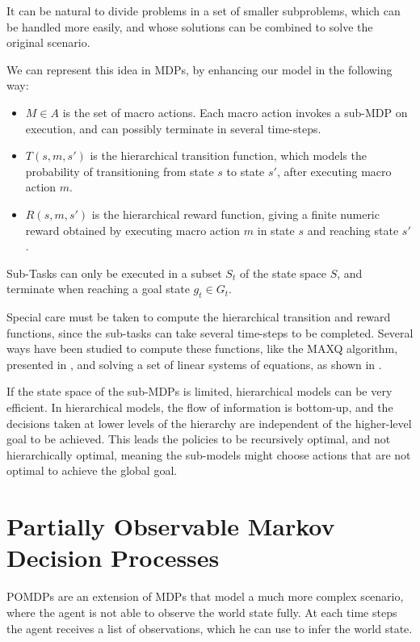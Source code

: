 It can be natural to divide problems in a set of smaller subproblems, which can be handled more easily, and whose solutions can be combined to solve the original scenario. 

We can represent this idea in MDPs, by enhancing our model in the following way:
\begin{itemize}
\item $M \in A$ is the set of macro actions. Each macro action invokes a sub-MDP on execution, and can possibly terminate in several time-steps.
\item  $T(s,m,s')$ is the hierarchical transition function, which models the probability of transitioning from state $s$ to state $s'$, after executing macro action $m$.
\item $R(s,m,s')$ is the hierarchical reward function, giving a finite numeric reward obtained by executing macro action $m$ in state $s$ and reaching state $s'$.
\end{itemize}

Sub-Tasks can only be executed in a subset $S_t$ of the state space $S$, and terminate when reaching a goal state $g_t \in G_t$.

Special care must be taken to compute the hierarchical transition and reward functions, since the sub-tasks can take several time-steps to be completed. Several ways have been studied to compute these functions, like the MAXQ algorithm, presented in \cite{dietterich2000hierarchical}, and solving a set of linear systems of equations, as shown in \cite{hauskrecht1998hierarchical}.

If the state space of the sub-MDPs is limited, hierarchical models can be very efficient. In hierarchical models, the flow of information is bottom-up, and the decisions taken at lower levels of the hierarchy are independent of the higher-level goal to be achieved. This leads the policies to be recursively optimal, and not hierarchically optimal, meaning the sub-models might choose actions that are not optimal to achieve the global goal.

\section{Partially Observable Markov Decision Processes}
\label{sec:methods-pomdp}


POMDPs are an extension of MDPs that model a much more complex scenario, where the agent is not able to observe the world state fully. At each time steps the agent receives a list of observations, which he can use to infer the world state.

